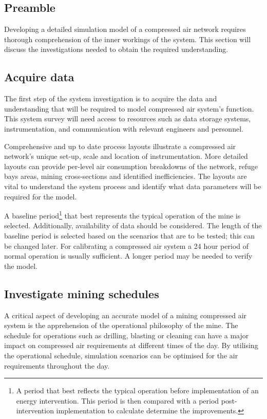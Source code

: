 	\subsection{Preamble}
		Developing a detailed simulation model of a compressed air network requires thorough comprehension of the inner workings of the system. This section will discuss the investigations needed to obtain the required understanding.
	\subsection{Acquire data} %
	The first step of the system investigation is to acquire the data and understanding that will be required to model compressed air system's function. This system survey will need access to resources such as data storage systems, instrumentation, and communication with relevant engineers and personnel.
	\par 
	Comprehensive and up to date process layouts illustrate a compressed air network's unique set-up, scale and location of instrumentation. More detailed layouts can provide per-level air consumption breakdowns of the network, refuge bays areas, mining cross-sections and identified inefficiencies. The layouts are vital to understand the system process and identify what data parameters will be required for the model. 
	\par 
	A baseline period\footnote{A period that best reflects the typical operation before implementation of an energy intervention. This period is then compared with a period post-intervention implementation to calculate determine the improvements.} that best represents the typical operation of the mine is selected. Additionally, availability of data should be considered. The length of the baseline period is selected based on the scenarios that are to be tested; this can be changed later. For calibrating a compressed air system a 24 hour period of normal operation is usually sufficient. A longer period may be needed to verify the model. 

	\subsection{Investigate mining schedules}
	A critical aspect of developing an accurate model of a mining compressed air system is the apprehension of the operational philosophy of the mine. The schedule for operations such as drilling, blasting or cleaning can have a major impact on compressed air requirements at different times of the day. By utilising the operational schedule, simulation scenarios can be optimised for the air requirements throughout the day.	
	
